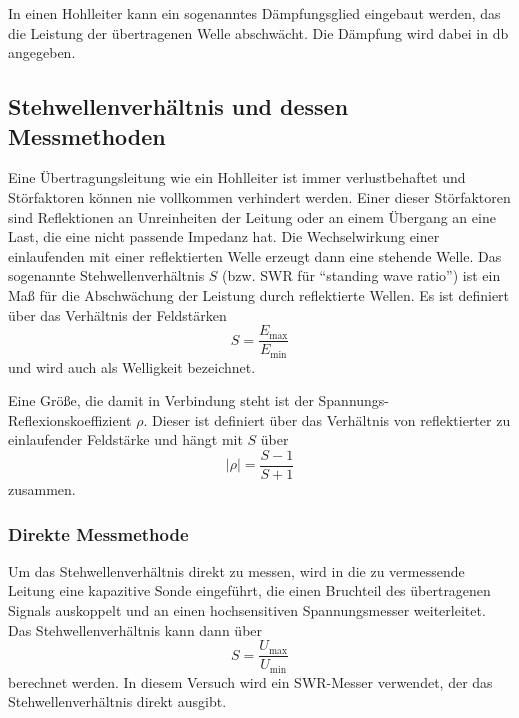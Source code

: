 In einen Hohlleiter kann ein sogenanntes Dämpfungsglied eingebaut werden, das die Leistung der übertragenen Welle abschwächt.
Die Dämpfung wird dabei in $\si{\decibel}$ angegeben.

\subsection{Stehwellenverhältnis und dessen Messmethoden}
\label{ssec:Stehwellenverhältnis}

Eine Übertragungsleitung wie ein Hohlleiter ist immer verlustbehaftet und Störfaktoren können nie vollkommen verhindert werden.
Einer dieser Störfaktoren sind Reflektionen an Unreinheiten der Leitung oder an einem Übergang an eine Last, die eine nicht passende Impedanz hat.
Die Wechselwirkung einer einlaufenden mit einer reflektierten Welle erzeugt dann eine stehende Welle.
Das sogenannte Stehwellenverhältnis $S$ (bzw. SWR für \enquote{standing wave ratio}) ist ein Maß für die Abschwächung der Leistung durch reflektierte Wellen.
Es ist definiert über das Verhältnis der Feldstärken
\begin{equation}
    S = \frac{E_\text{max}}{E_\text{min}}
\end{equation}
und wird auch als Welligkeit bezeichnet.

Eine Größe, die damit in Verbindung steht ist der Spannungs-Reflexionskoeffizient $\rho$.
Dieser ist definiert über das Verhältnis von reflektierter zu einlaufender Feldstärke 
und hängt mit $S$ über
\begin{equation}
    | \rho | = \frac{S-1}{S+1}
\end{equation}
zusammen.

\subsubsection{Direkte Messmethode}
\label{sssec:Direkte_Messmethode}

Um das Stehwellenverhältnis direkt zu messen, wird in die zu vermessende Leitung eine kapazitive Sonde eingeführt, 
die einen Bruchteil des übertragenen Signals auskoppelt und an einen hochsensitiven Spannungsmesser weiterleitet.
Das Stehwellenverhältnis kann dann über
\begin{equation}
    S = \frac{U_\text{max}}{U_\text{min}}
    \label{eq:Direkte_Methode}
\end{equation}
berechnet werden.
In diesem Versuch wird ein SWR-Messer verwendet, der das Stehwellenverhältnis direkt ausgibt.

